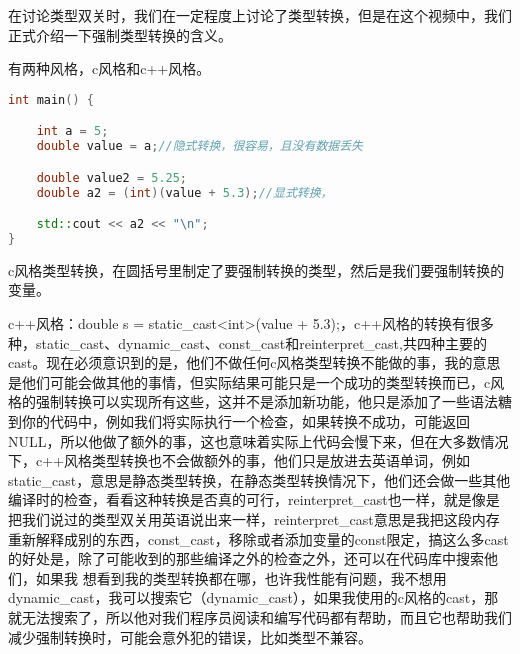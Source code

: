在讨论类型双关时，我们在一定程度上讨论了类型转换，但是在这个视频中，我们正式介绍一下强制类型转换的含义。

有两种风格，c风格和c++风格。

\begin{lstlisting}[language=c++]
int main() {

    int a = 5;
    double value = a;//隐式转换，很容易，且没有数据丢失

    double value2 = 5.25;
    double a2 = (int)(value + 5.3);//显式转换，

    std::cout << a2 << "\n";
}
\end{lstlisting}

c风格类型转换，在圆括号里制定了要强制转换的类型，然后是我们要强制转换的变量。

c++风格：{\ncodestyle double s = static_cast<int>(value + 5.3);}，c++风格的转换有很多种，{\ncodestyle static_cast}、{\ncodestyle dynamic_cast}、{\ncodestyle const_cast}和{\ncodestyle reinterpret_cast},共四种主要的{\ncodestyle cast}。现在必须意识到的是，他们不做任何c风格类型转换不能做的事，我的意思是他们可能会做其他的事情，但实际结果可能只是一个成功的类型转换而已，c风格的强制转换可以实现所有这些，这并不是添加新功能，他只是添加了一些语法糖到你的代码中，例如我们将实际执行一个检查，如果转换不成功，可能返回{\ncodestyle NULL}，所以他做了额外的事，这也意味着实际上代码会慢下来，但在大多数情况下，c++风格类型转换也不会做额外的事，他们只是放进去英语单词，例如{\ncodestyle static_cast}，意思是静态类型转换，在静态类型转换情况下，他们还会做一些其他编译时的检查，看看这种转换是否真的可行，{\ncodestyle reinterpret_cast}也一样，就是像是把我们说过的类型双关用英语说出来一样，{\ncodestyle reinterpret_cast}意思是我把这段内存重新解释成别的东西，const_cast，移除或者添加变量的const限定，搞这么多cast的好处是，除了可能收到的那些编译之外的检查之外，还可以在代码库中搜索他们，如果我 想看到我的类型转换都在哪，也许我性能有问题，我不想用{\ncodestyle dynamic_cast}，我可以搜索它（{\ncodestyle dynamic_cast}），如果我使用的c风格的cast，那就无法搜索了，所以他对我们程序员阅读和编写代码都有帮助，而且它也帮助我们减少强制转换时，可能会意外犯的错误，比如类型不兼容。

